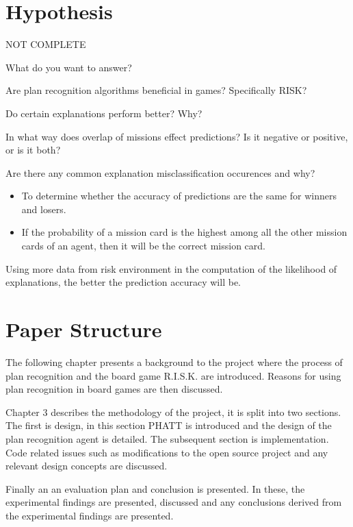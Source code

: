 \documentclass[parskip]{cs4rep}
\begin{document}
\section{Hypothesis}

NOT COMPLETE

What do you want to answer?

Are plan recognition algorithms beneficial in games? Specifically RISK?

Do certain explanations perform better? Why?

In what way does overlap of missions effect predictions? Is it negative or positive, or is it both?

Are there any common explanation misclassification occurences and why?

\begin{itemize}
\item
To determine whether the accuracy of predictions are the same for winners and losers.
\item
If the probability of a mission card is the highest among all the other mission cards of an agent, then it will be the correct mission card.
\newline
\end{itemize}

Using more data from risk environment in the computation of the likelihood of explanations, the better the prediction accuracy will be.

\section{Paper Structure}

The following chapter presents a background to the project where the process of plan recognition and the board game R.I.S.K. are introduced. Reasons for using plan recognition in board games are then discussed.

Chapter 3 describes the methodology of the project, it is split into two sections. The first is design, in this section PHATT is introduced and the design of the plan recognition agent is detailed. The subsequent section is implementation. Code related issues such as modifications to the open source project and any relevant design concepts are discussed. 

Finally an an evaluation plan and conclusion is presented. In these, the experimental findings are presented, discussed and any conclusions derived from the experimental findings are presented.
\end{document}
